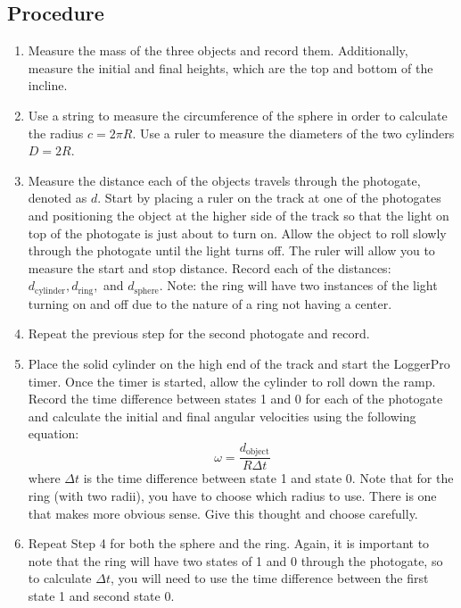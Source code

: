 \documentclass{report}
\begin{document}
    \bigbreak \noindent 
    \subsection{Procedure}
    \begin{enumerate}
        \item Measure the mass of the three objects and record them. Additionally, measure the initial and final heights, which are the top and bottom of the incline.
        \item Use a string to measure the circumference of the sphere in order to calculate the radius \( c = 2\pi R \). Use a ruler to measure the diameters of the two cylinders \( D = 2R \).
        \item Measure the distance each of the objects travels through the photogate, denoted as \( d \). Start by placing a ruler on the track at one of the photogates and positioning the object at the higher side of the track so that the light on top of the photogate is just about to turn on. Allow the object to roll slowly through the photogate until the light turns off. The ruler will allow you to measure the start and stop distance. Record each of the distances: \( d_{\text{cylinder}}, d_{\text{ring}}, \) and \( d_{\text{sphere}} \). Note: the ring will have two instances of the light turning on and off due to the nature of a ring not having a center.
        \item Repeat the previous step for the second photogate and record.
        \item Place the solid cylinder on the high end of the track and start the LoggerPro timer. Once the timer is started, allow the cylinder to roll down the ramp. Record the time difference between states 1 and 0 for each of the photogate and calculate the initial and final angular velocities using the following equation:
            \[
                \omega = \frac{d_{\text{object}}}{R\Delta t}
            \]
            where \(\Delta t\) is the time difference between state 1 and state 0. Note that for the ring (with two radii), you have to choose which radius to use. There is one that makes more obvious sense. Give this thought and choose carefully.
        \item Repeat Step 4 for both the sphere and the ring. Again, it is important to note that the ring will have two states of 1 and 0 through the photogate, so to calculate \(\Delta t\), you will need to use the time difference between the first state 1 and second state 0.
    \end{enumerate}
\end{document}
